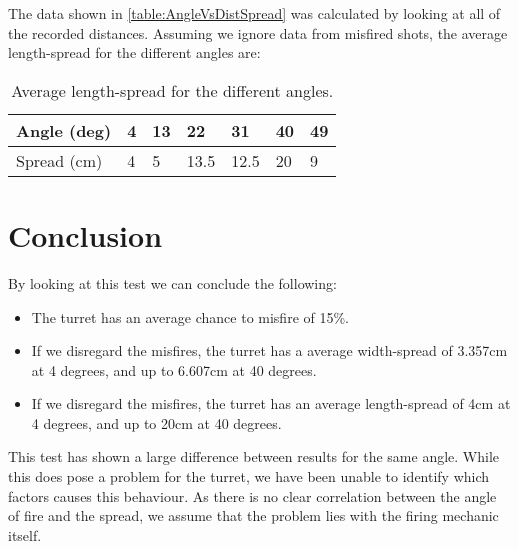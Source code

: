 The data shown in \autoref{table:AngleVsDistSpread} was calculated by looking at
all of the recorded distances. Assuming we ignore data from misfired shots, the
average length-spread for the different angles are:

\begin{table}[H]
\centering
\caption{Average length-spread for the different angles.}
\begin{tabular}{|l|l|l|l|l|l|l|}
\hline
Angle (deg) & 4 & 13 & 22   & 31   & 40 & 49 \\ \hline
Spread (cm) & 4 & 5  & 13.5 & 12.5 & 20 & 9  \\ \hline
\end{tabular}
\end{table}


\section{Conclusion}
By looking at this test we can conclude the following:
\begin{itemize}
  \item The turret has an average chance to misfire of 15\%.
  \item If we disregard the misfires, the turret has a average width-spread of
  3.357cm at 4 degrees, and up to 6.607cm at 40 degrees.
  \item If we disregard the misfires, the turret has an average length-spread of
  4cm at 4 degrees, and up to 20cm at 40 degrees.
  
\end{itemize}

This test has shown a large difference between results for the
same angle. While this does pose a problem for the turret, we have been unable
to identify which factors causes this behaviour. As there is no clear
correlation between the angle of fire and the spread, we assume that the problem
lies with the firing mechanic itself. 
